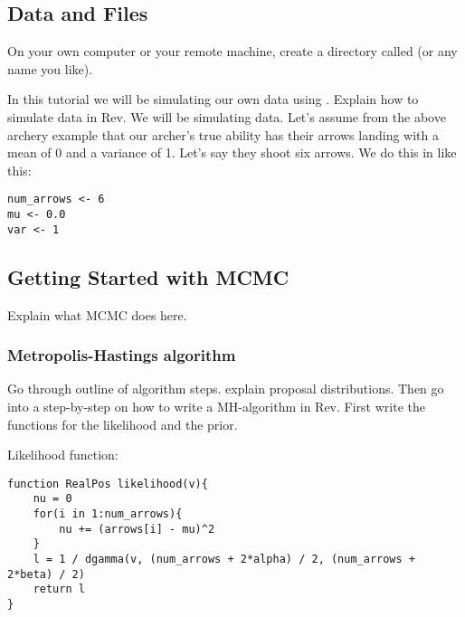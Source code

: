 \medskip
\subsection{Data and Files}\label{subsect:Exercise-DataFiles}

{\begin{framed}
On your own computer or your remote machine, create a directory called {\textcolor{red}{}} (or any name you like).

\end{framed}}

In this tutorial we will be simulating our own data using \RevBayes. Explain how to simulate data in Rev. We will be simulating data. Let's assume from the above archery example that our archer's true ability has their arrows landing with a mean of 0 and a variance of 1. Let's say they shoot six arrows. We do this in \RevBayes like this:

 {\tt \begin{snugshade*}
\begin{lstlisting}
num_arrows <- 6
mu <- 0.0
var <- 1
\end{lstlisting}
\end{snugshade*}}



\bigskip
\subsection{Getting Started with MCMC\label{subsect:Exercise-GetStart}}

Explain what MCMC does here.

\subsubsection{Metropolis-Hastings algorithm}

Go through outline of algorithm steps. explain proposal distributions. Then go into a step-by-step on how to write a MH-algorithm in Rev. First write the functions for the likelihood and the prior. 

Likelihood function:

 {\tt \begin{snugshade*}
\begin{lstlisting}
function RealPos likelihood(v){
	nu = 0
	for(i in 1:num_arrows){
		nu += (arrows[i] - mu)^2
	}
	l = 1 / dgamma(v, (num_arrows + 2*alpha) / 2, (num_arrows + 2*beta) / 2)
	return l
}

\end{lstlisting}
\end{snugshade*}}


